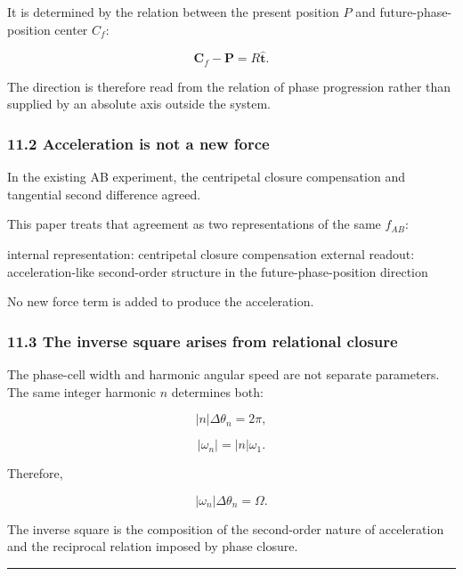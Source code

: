 \documentclass[
  a4paper,
]{article}
\newenvironment{Shaded}{}{}
\newcommand{\NormalTok}[1]{#1}
\begin{document}
It is determined by the relation between the present position \(P\) and
future-phase-position center \(C_f\):

\[
\boldsymbol C_f-\boldsymbol P
=R\hat{\boldsymbol t}.
\]

The direction is therefore read from the relation of phase progression
rather than supplied by an absolute axis outside the system.

\subsubsection{11.2 Acceleration is not a new
force}\label{acceleration-is-not-a-new-force}

In the existing AB experiment, the centripetal closure compensation and
tangential second difference agreed.

This paper treats that agreement as two representations of the same
\(f_{AB}\):

\begin{Shaded}
\begin{Highlighting}[]
\NormalTok{internal representation: centripetal closure compensation}
\NormalTok{external readout: acceleration{-}like second{-}order structure in the future{-}phase{-}position direction}
\end{Highlighting}
\end{Shaded}

No new force term is added to produce the acceleration.

\subsubsection{11.3 The inverse square arises from relational
closure}\label{the-inverse-square-arises-from-relational-closure}

The phase-cell width and harmonic angular speed are not separate
parameters. The same integer harmonic \(n\) determines both:

\[
|n|\Delta\theta_n=2\pi,
\]

\[
|\omega_n|=|n|\omega_1.
\]

Therefore,

\[
|\omega_n|\Delta\theta_n=\Omega.
\]

The inverse square is the composition of the second-order nature of
acceleration and the reciprocal relation imposed by phase closure.

\begin{center}\rule{0.5\linewidth}{0.5pt}\end{center}
\end{document}
